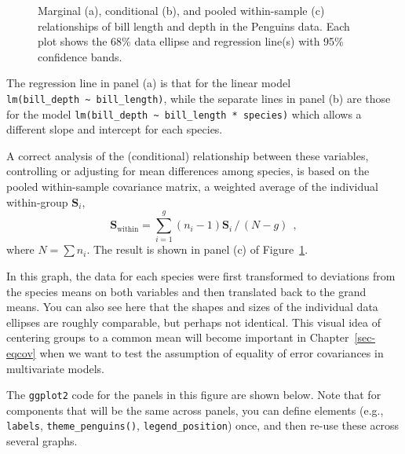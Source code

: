 \documentclass[
  letterpaper,
  10pt,
  krantz2]{krantz}
\begin{document}
\begin{figure}


\caption{\label{fig-peng-simpsons}Marginal (a), conditional (b), and
pooled within-sample (c) relationships of bill length and depth in the
Penguins data. Each plot shows the 68\% data ellipse and regression
line(s) with 95\% confidence bands.}

\end{figure}%

The regression line in panel (a) is that for the linear model
\texttt{lm(bill\_depth\ \textasciitilde{}\ bill\_length)}, while the
separate lines in panel (b) are those for the model
\texttt{lm(bill\_depth\ \textasciitilde{}\ bill\_length\ *\ species)}
which allows a different slope and intercept for each species.

A correct analysis of the (conditional) relationship between these
variables, controlling or adjusting for mean differences among species,
is based on the pooled within-sample covariance matrix, a weighted
average of the individual within-group \(\mathbf{S}_i\), \[
\mathbf{S}_{\textrm{within}}  =
\sum_{i=1}^g
(n_i - 1) \mathbf{S}_i \, / \, (N - g)
\:\: ,
\] where \(N = \sum n_i\). The result is shown in panel (c) of
Figure~\ref{fig-peng-simpsons}.

In this graph, the data for each species were first transformed to
deviations from the species means on both variables and then translated
back to the grand means. You can also see here that the shapes and sizes
of the individual data ellipses are roughly comparable, but perhaps not
identical. This visual idea of centering groups to a common mean will
become important in Chapter~\ref{sec-eqcov} when we want to test the
assumption of equality of error covariances in multivariate models.

The \texttt{ggplot2} code for the panels in this figure are shown below.
Note that for components that will be the same across panels, you can
define elements (e.g., \texttt{labels}, \texttt{theme\_penguins()},
\texttt{legend\_position}) once, and then re-use these across several
graphs.
\end{document}
